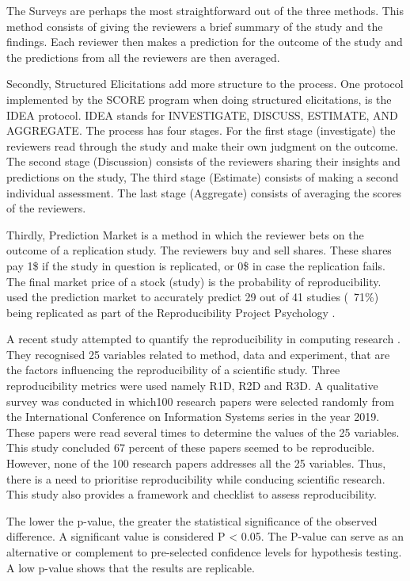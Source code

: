 \documentclass[
10pt, %
a4paper, %
oneside, %
headinclude,footinclude, %
BCOR5mm, %
]{scrartcl}
\begin{document}
The Surveys are perhaps the most straightforward out of the three methods. This method consists of giving the reviewers a brief summary of the study and the findings. Each reviewer then makes a prediction for the outcome of the study and the predictions from all the reviewers are then averaged. 

Secondly, Structured Elicitations add more structure to the process. One protocol implemented by the SCORE program when doing structured elicitations, is the IDEA protocol. IDEA stands for INVESTIGATE, DISCUSS, ESTIMATE, AND AGGREGATE. The process has four stages. For the first stage (investigate) the 
reviewers read through the study and make their own judgment on the outcome. The second stage (Discussion) consists of the reviewers sharing their insights and predictions on the study, The third stage (Estimate) consists of making a second individual assessment. The last stage (Aggregate)
consists of averaging the scores of the reviewers. 

Thirdly, Prediction Market is a method in which the reviewer bets on the outcome of a replication study. The reviewers buy and sell shares. These shares pay 1\$ if the study in question is replicated, or 0\$ in case the replication fails. The final market price of a stock (study) is the probability of 
reproducibility. \cite{Dreber2015} used the prediction market to accurately predict 29 out of 41 studies (~71\%) being replicated as part of the Reproducibility Project Psychology \cite{Dreber2015}. 

A recent study attempted to quantify the reproducibility in computing research \cite{Raghupathi2022}. 
They recognised 25 variables related to method, data and experiment, that are the factors influencing the reproducibility of a scientific study. 
Three reproducibility metrics were used namely R1D, R2D and R3D. 
A qualitative survey was conducted in which100 research papers were selected randomly from the International Conference on Information Systems series in the year 2019.
These papers were read several times to determine the values of the 25 variables. 
This study concluded 67 percent of these papers seemed to be reproducible. 
However, none of the 100 research papers addresses all the 25 variables.
Thus, there is a need to prioritise reproducibility while conducing scientific research. 
This study also provides a framework and checklist to assess reproducibility.


The lower the p-value, the greater the statistical significance of the observed difference. A significant value is considered P < 0.05. The P-value can serve as an alternative or complement to pre-selected confidence levels for hypothesis testing. A low p-value shows that the results are replicable.
\end{document}

